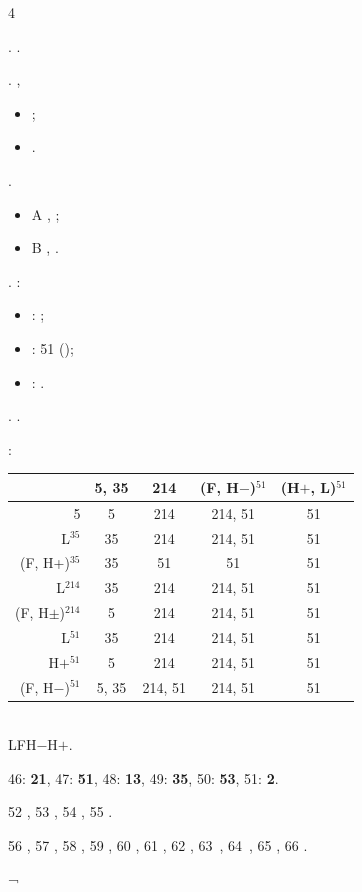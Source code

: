 \begin{assgts}\setcounter{enumi}4
\item \mandcomp.
.

\dejaknow. \whenrest,
%
\begin{itemize}
\item {};
\item {}.
\end{itemize}
%
\usethese {\inmandar}. \keredomo
%
\begin{itemize}
\item \onsetcis A{\palatals} , \indeterx {\acconset};
\item \onsetcis B{\retrofs} \onsetane, \indeterx {\accrhyme}.
\end{itemize}
%
\item \vocanton. \mandtone:
%
\begin{itemize}
\item \risetone: ;
\item \flattone: 51 (\alwaysso);
\item \falltone: .
\end{itemize}
%
\decontur. \voidevel {\falltone}{\flattone\au\risetone}.

\somanton {\inmandar}:\medskip \\
%
\begin{tabular}{|r||c|c|c|c|}\hline
& 5, 35 & 214 & (F, H$-$)$^{51}$ & (H$+$, L)$^{51}$ \\\hline\hline
5 & 5 & 214 & 214, 51 & 51 \\\hline
\hline
L$^{35}$ & 35 & 214 & 214, 51 & 51 \\\hline
(F, H+)$^{35}$ & 35 & 51 & 51 & 51 \\\hline
\hline
L$^{214}$ & 35 & 214 & 214, 51 & 51 \\\hline
(F, H$\pm$)$^{214}$ & 5 & 214 & 214, 51 & 51 \\\hline
\hline
L$^{51}$ & 35 & 214 & 214, 51 & 51 \\\hline
H$+{}^{51}$ & 5 & 214 & 214, 51 & 51 \\\hline
(F, H$-$)$^{51}$ & 5, 35 & 214, 51 & 214, 51 & 51 \\\hline
\end{tabular}
\medskip \\
%
\legecons LF{H$-$}{H$+$}. \dimanton
%
\item \rarethat
%
\item 46: \textbf{21}, 47: \textbf{51}, 48: \textbf{13}, 49: \textbf{35}, 50: \textbf{53}, 51: \textbf{2}.
%
\item 52 , 53 , 54 , 55 .
%
\item 56 , 57 , 58 , 59 , 60 , 61 , 62 , 63~, 64~, 65 , 66 .
\end{assgts}
¬

